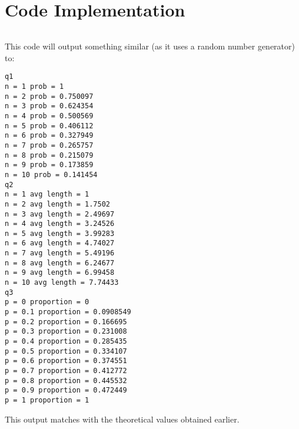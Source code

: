 \section{Code Implementation}
\inputminted{cpp}{code/ummrc.cpp}
This code will output something similar (as it uses a random number generator) to:
\begin{verbatim}
q1
n = 1 prob = 1
n = 2 prob = 0.750097
n = 3 prob = 0.624354
n = 4 prob = 0.500569
n = 5 prob = 0.406112
n = 6 prob = 0.327949
n = 7 prob = 0.265757
n = 8 prob = 0.215079
n = 9 prob = 0.173859
n = 10 prob = 0.141454
q2
n = 1 avg length = 1
n = 2 avg length = 1.7502
n = 3 avg length = 2.49697
n = 4 avg length = 3.24526
n = 5 avg length = 3.99283
n = 6 avg length = 4.74027
n = 7 avg length = 5.49196
n = 8 avg length = 6.24677
n = 9 avg length = 6.99458
n = 10 avg length = 7.74433
q3
p = 0 proportion = 0
p = 0.1 proportion = 0.0908549
p = 0.2 proportion = 0.166695
p = 0.3 proportion = 0.231008
p = 0.4 proportion = 0.285435
p = 0.5 proportion = 0.334107
p = 0.6 proportion = 0.374551
p = 0.7 proportion = 0.412772
p = 0.8 proportion = 0.445532
p = 0.9 proportion = 0.472449
p = 1 proportion = 1
\end{verbatim}
This output matches with the theoretical values obtained earlier.
